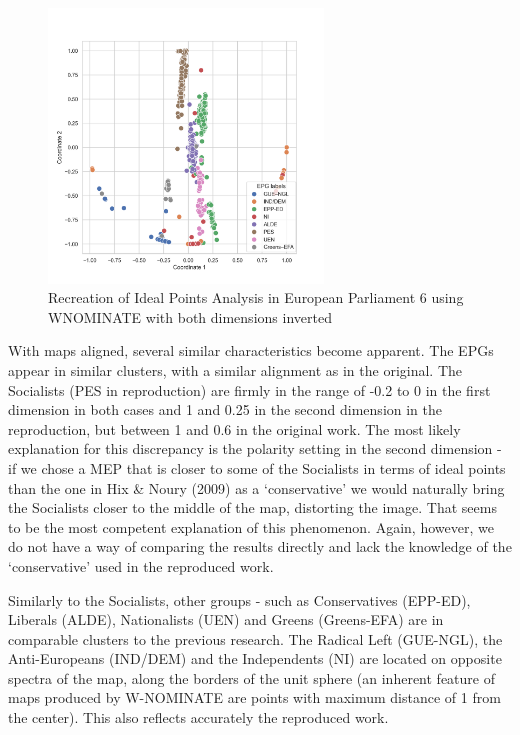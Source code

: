\documentclass[a4paper,12pt]{report}
\begin{document}
    \begin{figure}[H]
        \centering
        \includegraphics[width=0.65\textwidth]{Graphs/WNOMINATEflipped2d}
        \caption
        {Recreation of Ideal Points Analysis in European Parliament 6 using WNOMINATE with both dimensions
        inverted}
        \label{fig:WNOMINATE 6 FLIPPED}
    \end{figure}
    With maps aligned, several similar characteristics become apparent. The EPGs appear in similar
    clusters, with a similar alignment as in the original. The Socialists (PES in reproduction) are
    firmly in the range of
    -0.2 to 0 in the first dimension in both cases and 1 and 0.25 in the second dimension in the
    reproduction, but between 1 and 0.6 in the original work. The most likely explanation for this
    discrepancy is the polarity setting in the second dimension - if we chose a MEP that is closer to
    some of the
    Socialists in terms of ideal points than the one in Hix \& Noury (2009) as a `conservative' we would
    naturally
    bring the Socialists closer to the middle of the map, distorting the image. That seems to be the
    most competent explanation of this phenomenon. Again, however, we do not have a way of comparing the
    results directly and lack the knowledge of the `conservative' used in the reproduced work.

    Similarly to the Socialists, other groups - such as Conservatives (EPP-ED), Liberals (ALDE),
    Nationalists (UEN) and Greens (Greens-EFA) are in comparable clusters to the previous research. The
    Radical Left (GUE-NGL), the Anti-Europeans (IND/DEM) and the Independents (NI) are located on
    opposite spectra of the map, along the borders of the unit sphere (an inherent feature of maps
    produced by W-NOMINATE are points with maximum distance of 1 from the center). This also reflects
    accurately the reproduced work.
\end{document}

